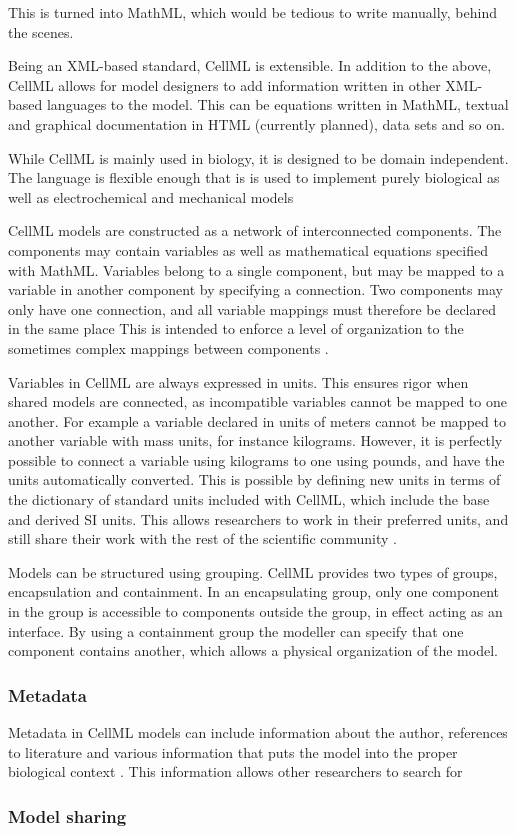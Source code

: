 \documentclass[\rootfolder/main.tex]{subfiles}
\begin{document}
This is turned into MathML, which would be tedious to write manually, behind the scenes.

Being an XML-based standard, CellML is extensible.
In addition to the above, CellML allows for model designers to add information written in other XML-based languages to the model.
This can be equations written in MathML, textual and graphical documentation in HTML (currently planned), data sets and so on.

While CellML is mainly used in biology, it is designed to be domain independent.
The language is flexible enough that is is used to implement purely biological as well as electrochemical and mechanical models \cite{cuellar2003}

CellML models are constructed as a network of interconnected components.
The components may contain variables as well as mathematical equations specified with MathML.
Variables belong to a single component, but may be mapped to a variable in another component by specifying a connection.
Two components may only have one connection, and all variable mappings must therefore be declared in the same place
This is intended to enforce a level of organization to the sometimes complex mappings between components \cite{cuellar2003}.

Variables in CellML are always expressed in units.
This ensures rigor when shared models are connected, as incompatible variables cannot be mapped to one another.
For example a variable declared in units of meters cannot be mapped to another variable with mass units, for instance kilograms.
However, it is perfectly possible to connect a variable using kilograms to one using pounds, and have the units automatically converted.
This is possible by defining new units in terms of the dictionary of standard units included with CellML, which include the base and derived SI units.
This allows researchers to work in their preferred units, and still share their work with the rest of the scientific community \cite{cuellar2003}.

Models can be structured using grouping.
CellML provides two types of groups, encapsulation and containment.
In an encapsulating group, only one component in the group is accessible to components outside the group, in effect acting as an interface.
By using a containment group the modeller can specify that one component contains another, which allows a physical organization of the model.

\subsubsection{Metadata}

Metadata in CellML models can include information about the author, references to literature and various information that puts the model into the proper biological context \cite{cuellar2003}.
This information allows other researchers to search for

\subsubsection{Model sharing}
\end{document}
